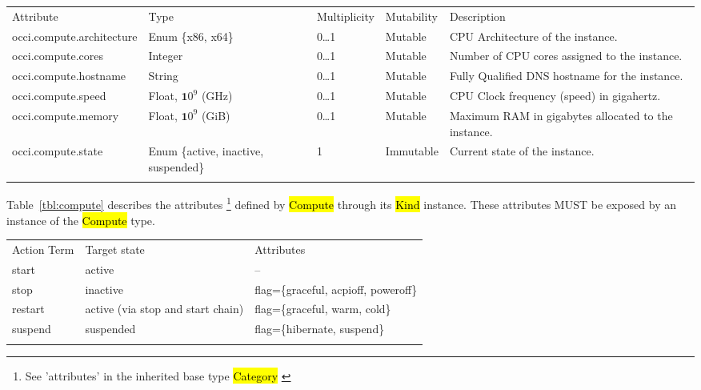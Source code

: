 \documentclass[10pt,a4paper]{article}
\begin{document}
	{
		\begin{tabular}{lp{2.5cm}p{1cm}lp{6cm}}
		\toprule
		Attribute&Type&Multi\-plicity&Mutability&Description\\
		\colrule
		occi.compute.architecture & Enum \{x86, x64\} & 0\ldots1 
		& Mutable & CPU Architecture of the instance.\\
		occi.compute.cores & Integer & 0\ldots1 & Mutable 
		& Number of CPU cores assigned to the instance.\\
		occi.compute.hostname & String & 0\ldots1 
		& Mutable & Fully Qualified DNS hostname for the instance.\\
		occi.compute.speed & Float, ${\mathbf 10}^9$ (GHz) & 0\ldots1 
		& Mutable & CPU Clock frequency (speed) in gigahertz.\\
		occi.compute.memory & Float, ${\mathbf 10}^9$ (GiB) & 0\ldots1 
		& Mutable & Maximum RAM in gigabytes allocated to the instance.\\
		occi.compute.state & Enum \{active, inactive, suspended\} & 1 
		& Immutable & Current state of the instance.\\
		\botrule
		\end{tabular}
	}

Table~\ref{tbl:compute} describes the attributes \footnote{See ’attributes’ in the inherited 
base type \hl{Category}  \cite{occi:core}} 
defined by \hl{Compute} through its \hl{Kind} instance. These attributes
MUST be exposed by an instance of the \hl{Compute} type.


{
	\begin{tabular}{lll}
	\toprule
	Action Term & Target state & Attributes \\
	\colrule
	start & active & -- \\
	stop & inactive & flag=\{graceful, acpioff, poweroff\} \\
	restart & active (via stop and start chain) & flag=\{graceful, warm, cold\} \\
	suspend & suspended & flag=\{hibernate, suspend\} \\
	\botrule
	\end{tabular}
}
\end{document}
